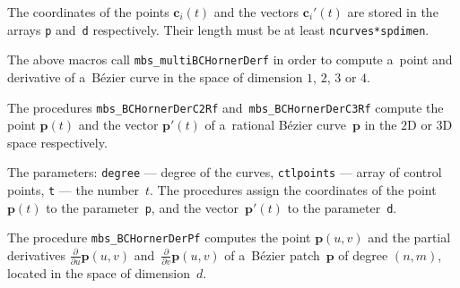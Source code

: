 The coordinates of the points $\bm{c}_i(t)$ and the vectors $\bm{c}_i'(t)$
are stored in the arrays \texttt{p} and~\texttt{d} respectively.
Their length must be at least \texttt{ncurves*spdimen}.

\vspace{\bigskipamount}
The above macros call \texttt{mbs\_multiBCHornerDerf} in order to
compute a~point and derivative of a~B\'{e}zier curve in the space
of dimension $1$, $2$, $3$ or $4$.

\vspace{\bigskipamount}
The procedures \texttt{mbs\_BCHornerDerC2Rf} and~\texttt{mbs\_BCHornerDerC3Rf}
compute the point $\bm{p}(t)$ and the vector $\bm{p}'(t)$ of a~rational B\'{e}zier
curve~$\bm{p}$ in the $2$D or $3$D space respectively.

The parameters: \texttt{degree} --- degree of the curves, \texttt{ctlpoints} ---
array of control points, \texttt{t} --- the number~$t$.
The procedures assign the coordinates of the point $\bm{p}(t)$
to the parameter~\texttt{p}, and the vector~$\bm{p}'(t)$ to the
parameter~\texttt{d}.

\vspace{\bigskipamount}
The procedure \texttt{mbs\_BCHornerDerPf} computes the point $\bm{p}(u,v)$
and the partial derivatives $\frac{\partial}{\partial u}\bm{p}(u,v)$
and~$\frac{\partial}{\partial v}\bm{p}(u,v)$ of a~B\'{e}zier patch~$\bm{p}$
of degree $(n,m)$, located in the space of dimension~$d$.

